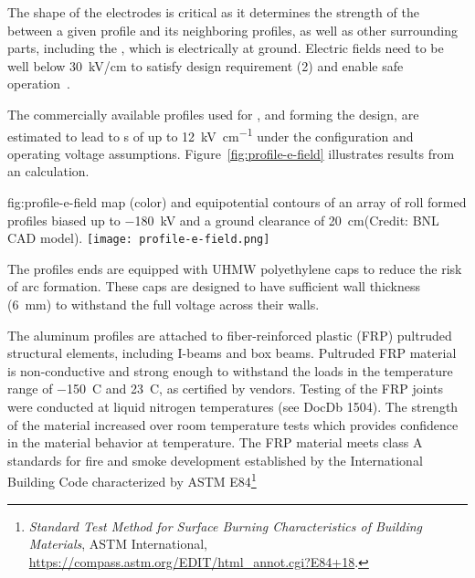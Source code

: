 The shape of the electrodes is critical as it determines the strength of the \efield{} between a given profile and its neighboring profiles, as well as
other surrounding parts, including the , which is electrically at ground. %
Electric fields need to be well below \SI{30}{\kilo\volt/\centi\meter} 
to satisfy design requirement (2) and enable safe  operation~\cite{Blatter:2014wua}. %

The commercially available profiles used for , and forming the  design, are estimated to lead to \efield{}s of up to \SI{12}{\kilo\volt\per\centi\meter} under the %
configuration and operating voltage assumptions.
Figure~\ref{fig:profile-e-field} illustrates results from an \efield{} calculation.
\begin{dunefigure}
{fig:profile-e-field}
{\efield map (color) and equipotential contours of an array of roll formed profiles biased up to \SI{-180}{\kV} and a ground clearance of \SI{20}{\cm}(Credit: BNL CAD model).} \texttt{[image: profile-e-field.png]}
\end{dunefigure}

The profiles ends are equipped with UHMW polyethylene caps to reduce the risk of arc formation.  These caps are designed to have sufficient wall thickness (\SI{6}{\milli\m}) to withstand the full voltage across their walls.

The aluminum profiles are attached to fiber-reinforced plastic (FRP) pultruded structural elements, including I-beams and box beams.  
Pultruded FRP material is non-conductive and strong enough to withstand the  loads  in the temperature range of \SI{-150}{C} and \SI{23}{C}, as certified by vendors. Testing of the FRP joints were conducted at liquid nitrogen temperatures (see DocDb 1504).  The strength of the material increased over room temperature tests which provides confidence in the material behavior at \lar  temperature. 
The FRP material meets class A standards for fire and smoke development established by the International Building Code characterized by ASTM E84\footnote{\textit{Standard Test Method for Surface Burning Characteristics of Building Materials}, ASTM International, \url{https://compass.astm.org/EDIT/html_annot.cgi?E84+18}.}

